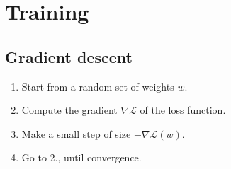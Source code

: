 \chapter{Training}


\section{Gradient descent}

\begin{enumerate} 
    \item 
        Start from a random set of weights $w$.
    \item Compute the gradient $\nabla \mathcal{L}$ of the loss function.
    \item Make a small step of size $-\nabla \mathcal{L}(w)$.
    \item Go to 2., until convergence.
\end{enumerate}


